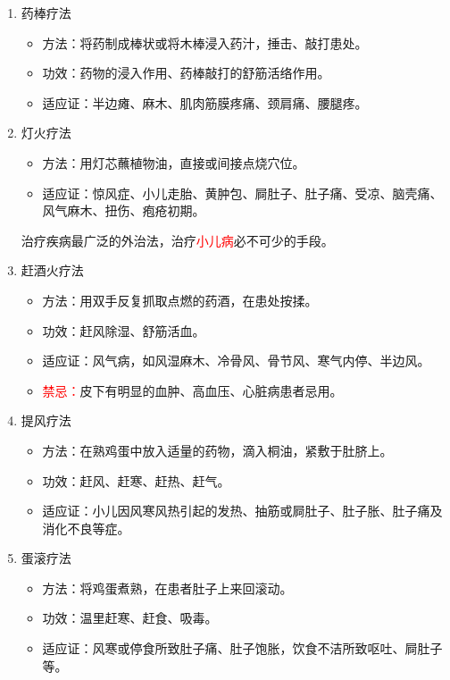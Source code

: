 \documentclass[cn,hazy,blue,12pt,normal,founder]{elegantnote}
\newcommand{\redt}[1]{\textcolor{red}{{}#1}}      %
\begin{document}
\begin{enumerate}
  \item 药棒疗法
  \begin{itemize}
    \item 方法：将药制成棒状或将木棒浸入药汁，捶击、敲打患处。
    \item 功效：药物的浸入作用、药棒敲打的舒筋活络作用。
    \item 适应证：半边瘫、麻木、肌肉筋膜疼痛、颈肩痛、腰腿疼。
  \end{itemize}
  \item 灯火疗法
  \begin{itemize}
    \item 方法：用灯芯蘸植物油，直接或间接点烧穴位。
    \item 适应证：惊风症、小儿走胎、黄肿包、屙肚子、肚子痛、受凉、脑壳痛、风气麻木、扭伤、疱疮初期。
  \end{itemize}
  \begin{note}
  治疗疾病最广泛的外治法，治疗\redt{小儿病}必不可少的手段。
  \end{note}
  \item 赶酒火疗法
  \begin{itemize}
    \item 方法：用双手反复抓取点燃的药酒，在患处按揉。
    \item 功效：赶风除湿、舒筋活血。
    \item 适应证：风气病，如风湿麻木、冷骨风、骨节风、寒气内停、半边风。
    \item \redt{禁忌：}皮下有明显的血肿、高血压、心脏病患者忌用。
  \end{itemize}
  \item 提风疗法
  \begin{itemize}
    \item 方法：在熟鸡蛋中放入适量的药物，滴入桐油，紧敷于肚脐上。
    \item 功效：赶风、赶寒、赶热、赶气。
    \item 适应证：小儿因风寒风热引起的发热、抽筋或屙肚子、肚子胀、肚子痛及消化不良等症。
  \end{itemize}
  \item 蛋滚疗法
  \begin{itemize}
    \item 方法：将鸡蛋煮熟，在患者肚子上来回滚动。
    \item 功效：温里赶寒、赶食、吸毒。
    \item 适应证：风寒或停食所致肚子痛、肚子饱胀，饮食不洁所致呕吐、屙肚子等。

\end{itemize}
\end{enumerate}
\end{document}
